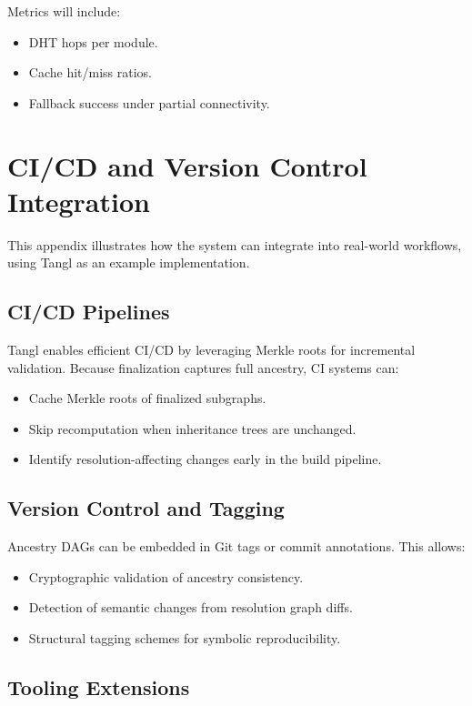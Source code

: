 \documentclass[sigplan,screen]{acmart}
\begin{document}
Metrics will include:

\begin{itemize}
  \item DHT hops per module.
  \item Cache hit/miss ratios.
  \item Fallback success under partial connectivity.
\end{itemize}

\section{CI/CD and Version Control Integration}
\label{appendix:ci-vcs}

This appendix illustrates how the system can integrate into real-world workflows, using Tangl as an example implementation.

\subsection{CI/CD Pipelines}

Tangl enables efficient CI/CD by leveraging Merkle roots for incremental validation. Because finalization captures full ancestry, CI systems can:

\begin{itemize}
  \item Cache Merkle roots of finalized subgraphs.
  \item Skip recomputation when inheritance trees are unchanged.
  \item Identify resolution-affecting changes early in the build pipeline.
\end{itemize}

\subsection{Version Control and Tagging}

Ancestry DAGs can be embedded in Git tags or commit annotations. This allows:

\begin{itemize}
  \item Cryptographic validation of ancestry consistency.
  \item Detection of semantic changes from resolution graph diffs.
  \item Structural tagging schemes for symbolic reproducibility.
\end{itemize}

\subsection{Tooling Extensions}
\end{document}

